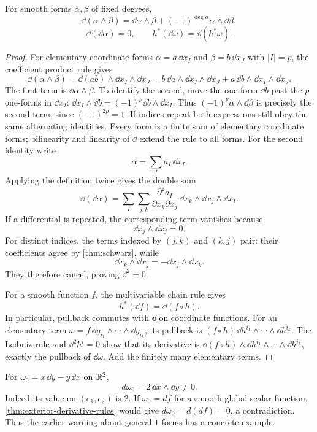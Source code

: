 \begin{theorem}
\label{thm:exterior-derivative-rules}
For smooth forms $\alpha,\beta$ of fixed degrees,
\[
\dd(\alpha\wedge\beta)
=
\dd\alpha\wedge\beta+(-1)^{\deg\alpha}\alpha\wedge\dd\beta,
\]
\[
\dd(\dd\alpha)=0,
\qquad
h^*(\dd\omega)=\dd(h^*\omega).
\]
\end{theorem}
\begin{proof}
For elementary coordinate forms $\alpha=a\,\dd x_I$ and
$\beta=b\,\dd x_J$ with $|I|=p$, the coefficient product rule gives
\[
\dd(\alpha\wedge\beta)=\dd(ab)\wedge\dd x_I\wedge\dd x_J
=b\,\dd a\wedge\dd x_I\wedge\dd x_J
+a\,\dd b\wedge\dd x_I\wedge\dd x_J.
\]
The first term is $\dd\alpha\wedge\beta$. To identify the second,
move the one-form $\dd b$ past the $p$ one-forms in $\dd x_I$:
$\dd x_I\wedge\dd b=(-1)^p\dd b\wedge\dd x_I$.
Thus $(-1)^p\alpha\wedge\dd\beta$ is precisely the second term, since
$(-1)^{2p}=1$. If indices repeat both expressions still obey the same
alternating identities. Every form is a finite sum of elementary coordinate
forms; bilinearity and linearity of $\dd$ extend the rule to all forms.
For the second identity write
\[
\alpha=\sum_I a_I\,\dd x_I.
\]
Applying the definition twice gives the double sum
\[
\dd(\dd\alpha)
=
\sum_I\sum_{j,k}
\frac{\partial^2a_I}{\partial x_k\partial x_j}\,
\dd x_k\wedge\dd x_j\wedge\dd x_I.
\]
If a differential is repeated, the corresponding term vanishes because
\[
\dd x_j\wedge\dd x_j=0.
\]
For distinct indices, the terms indexed by \((j,k)\) and \((k,j)\) pair:
their coefficients agree by \cref{thm:schwarz}, while
\[
\dd x_k\wedge\dd x_j=-\dd x_j\wedge\dd x_k.
\]
They therefore cancel, proving \(\dd^2=0\).

For a smooth function \(f\), the multivariable chain rule gives
\[
h^*(\dd f)=\dd(f\circ h).
\]
In particular, pullback commutes with \(\dd\) on coordinate functions.
For an elementary term $\omega=f\,\dd y_{i_1}\wedge\cdots\wedge\dd y_{i_k}$,
its pullback is $(f\circ h)\,\dd h^{i_1}\wedge\cdots\wedge\dd h^{i_k}$.
The Leibniz rule and $\dd^2h^i=0$ show that its derivative is
$\dd(f\circ h)\wedge\dd h^{i_1}\wedge\cdots\wedge\dd h^{i_k}$,
exactly the pullback of $\dd\omega$. Add the finitely many elementary terms.
\end{proof}
\begin{remark}
For $\omega_0=x\,\dd y-y\,\dd x$ on $\mathbb{R}^2$,
\[
d\omega_0=2\,\dd x\wedge\dd y\ne0.
\]
Indeed its value on $(e_1,e_2)$ is $2$. If $\omega_0=df$ for a smooth
global scalar function, \cref{thm:exterior-derivative-rules} would give
$d\omega_0=d(df)=0$, a contradiction. Thus the earlier warning about
general $1$-forms has a concrete example.
\end{remark}


